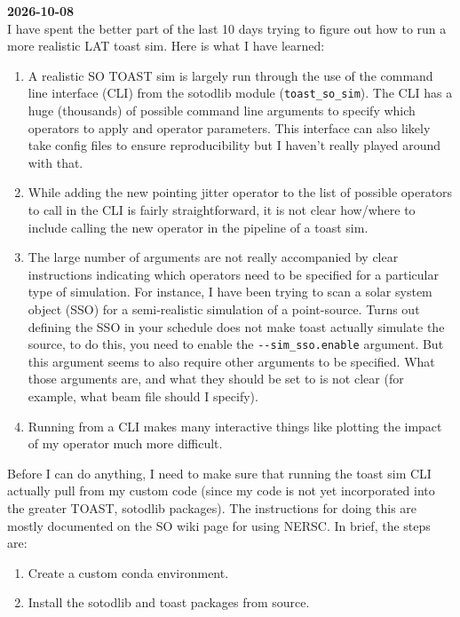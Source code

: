 
{\bf 2026-10-08}\\

I have spent the better part of the last 10 days trying to figure out how to run a more realistic LAT toast sim. Here is what I have learned:
\begin{enumerate}
    \item A realistic SO TOAST sim is largely run through the use of the command line interface (CLI) from the sotodlib module (\verb+toast_so_sim+). The CLI has a huge (thousands) of possible command line arguments to specify which operators to apply and operator parameters. This interface can also likely take config files to ensure reproducibility but I haven't really played around with that.
    \item While adding the new pointing jitter operator to the list of possible operators to call in the CLI is fairly straightforward, it is not clear how/where to include calling the new operator in the pipeline of a toast sim.
    \item The large number of arguments are not really accompanied by clear instructions indicating which operators need to be specified for a particular type of simulation. For instance, I have been trying to scan a solar system object (SSO) for a semi-realistic simulation of a point-source. Turns out defining the SSO in your schedule does not make toast actually simulate the source, to do this, you need to enable the \verb+--sim_sso.enable+ argument. But this argument seems to also require other arguments to be specified. What those arguments are, and what they should be set to is not clear (for example, what beam file should I specify).
    \item Running from a CLI makes many interactive things like plotting the impact of my operator much more difficult.
\end{enumerate}

Before I can do anything, I need to make sure that running the toast sim CLI actually pull from my custom code (since my code is not yet incorporated into the greater TOAST, sotodlib packages). The instructions for doing this are mostly documented on the SO wiki page for using NERSC. In brief, the steps are:
\begin{enumerate}
    \item Create a custom conda environment.
    \item Install the sotodlib and toast packages from source.
\end{enumerate}

